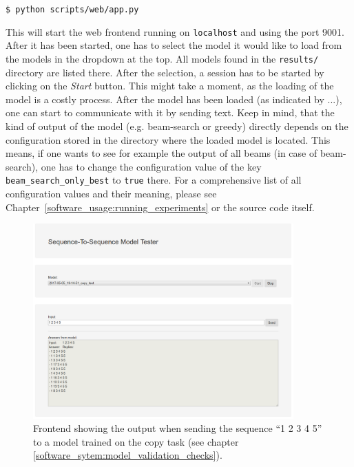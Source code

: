 \texttt{\$ python scripts/web/app.py}

This will start the web frontend running on \texttt{localhost} and using the port 9001. After it has been started, one has to select the model it would like to load from the models in the dropdown at the top. All models found in the \texttt{results/} directory are listed there. After the selection, a session has to be started by clicking on the \emph{Start} button. This might take a moment, as the loading of the model is a costly process. After the model has been loaded (as indicated by ...), one can start to communicate with it by sending text. Keep in mind, that the kind of output of the model (e.g. beam-search or greedy) directly depends on the configuration stored in the directory where the loaded model is located. This means, if one wants to see for example the output of all beams (in case of beam-search), one has to change the configuration value of the key \texttt{beam\_search\_only\_best} to \texttt{true} there. For a comprehensive list of all configuration values and their meaning, please see Chapter~\ref{software_usage:running_experiments} or the source code itself.
\\
\begin{figure}[H]
	\centering
	\includegraphics[width=10cm]{img/web_frontend_inference}
	\caption{Frontend showing the output when sending the sequence ``1 2 3 4 5'' to a model trained on the copy task (see chapter \ref{software_sytem:model_validation_checks}).}
\end{figure}